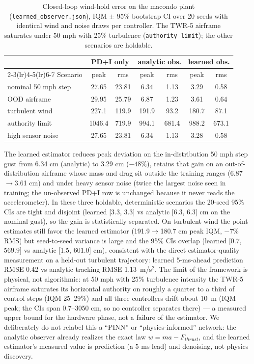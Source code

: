 \documentclass[12pt,a4paper]{article}
\begin{document}
\begin{table}[h]
\centering
\caption{Closed-loop wind-hold error on the macondo plant
(\texttt{learned\_observer.json}), IQM $\pm$ 95\% bootstrap CI over 20 seeds
with identical wind and noise draws per controller. The TWR-5 airframe
saturates under 50 mph with 25\% turbulence (\texttt{authority\_limit});
the other scenarios are holdable.}
\label{tab:observer}
\small
\begin{tabular}{lcccccc}
\toprule
 & \multicolumn{2}{c}{PD+I only} & \multicolumn{2}{c}{analytic obs.} & \multicolumn{2}{c}{learned obs.} \\
\cmidrule(lr){2-3}\cmidrule(lr){4-5}\cmidrule(lr){6-7}
Scenario & peak & rms & peak & rms & peak & rms \\
\midrule
nominal 50 mph step & 27.65 & 23.81 & 6.34 & 1.13 & 3.29 & 0.58 \\
OOD airframe & 29.95 & 25.79 & 6.87 & 1.23 & 3.61 & 0.64 \\
turbulent wind & 227.1 & 119.9 & 191.9 & 93.2 & 180.7 & 87.1 \\
authority limit & 1046.4 & 719.9 & 994.1 & 681.4 & 988.2 & 673.1 \\
high sensor noise & 27.65 & 23.81 & 6.34 & 1.13 & 3.28 & 0.58 \\
\bottomrule
\end{tabular}
\end{table}

The learned estimator reduces peak deviation on the in-distribution 50 mph
step gust from 6.34 cm (analytic) to 3.29 cm ($-48\%$), retains that gain on
an out-of-distribution airframe whose mass and drag sit outside the training
ranges (6.87$\to$3.61 cm) and under heavy sensor noise (twice the
largest noise seen in training; the un-observed PD+I row is unchanged because
it never reads the accelerometer). In these three holdable, deterministic
scenarios the 20-seed 95\% CIs are tight and disjoint (learned [3.3, 3.3] vs
analytic [6.3, 6.3] cm on the nominal gust), so the gain is statistically
separated. On turbulent wind the point estimates still favor the learned
estimator (191.9$\to$180.7 cm peak IQM, $-7\%$ RMS) but seed-to-seed
variance is large and the 95\% CIs overlap (learned [0.7, 569.9] vs analytic
[1.5, 601.0] cm), consistent with the direct estimator-quality measurement on
a held-out turbulent trajectory: learned 5-ms-ahead prediction RMSE 0.42 vs
analytic tracking RMSE 1.13~m/s$^2$. The limit of the framework is physical,
not algorithmic: at 50 mph with 25\% turbulence intensity the TWR-5 airframe
saturates its horizontal authority on roughly a quarter to a third of control
steps (IQM 25--29\%) and all three controllers drift about 10~m (IQM peak;
the CIs span 0.7--3050 cm, so no controller separates there) --- a measured
upper bound for the hardware phase, not a failure of the estimator. We deliberately do not relabel this a
``PINN'' or ``physics-informed'' network: the analytic observer already
realizes the exact law $w = m a - F_{thrust}$, and the learned estimator's
measured value is prediction (a 5 ms lead) and denoising, not physics
discovery.
\end{document}
